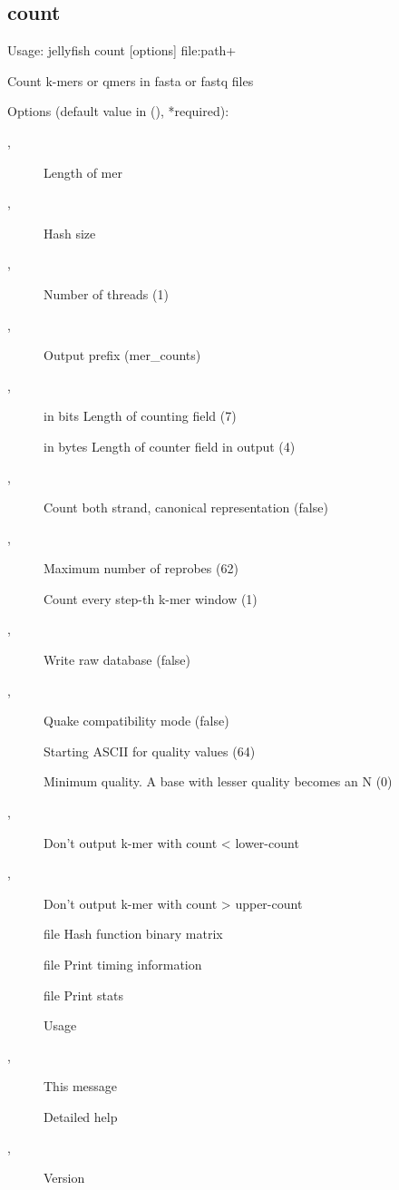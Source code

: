 \subsection{count}
\noindent Usage: jellyfish count [options] file:path+

\noindent Count k-mers or qmers in fasta or fastq files

\noindent Options (default value in (), *required):
\begin{description}
\item[,] \noindent *Length of mer
\item[,] \noindent *Hash size
\item[,] \noindent Number of threads (1)
\item[,] \noindent Output prefix (mer\_counts)
\item[,] \noindent in bits         Length of counting field (7)
\item[] \noindent in bytes    Length of counter field in output (4)
\item[,] \noindent Count both strand, canonical representation (false)
\item[,] \noindent Maximum number of reprobes (62)
\item[] \noindent Count every step-th k-mer window (1)
\item[,] \noindent Write raw database (false)
\item[,] \noindent Quake compatibility mode (false)
\item[] \noindent Starting ASCII for quality values (64)
\item[] \noindent Minimum quality. A base with lesser quality becomes an N (0)
\item[,] \noindent Don't output k-mer with count < lower-count
\item[,] \noindent Don't output k-mer with count > upper-count
\item[] \noindent file                 Hash function binary matrix
\item[] \noindent file                 Print timing information
\item[] \noindent file                   Print stats
\item[] \noindent Usage
\item[,] \noindent This message
\item[] \noindent Detailed help
\item[,] \noindent Version
\end{description}

